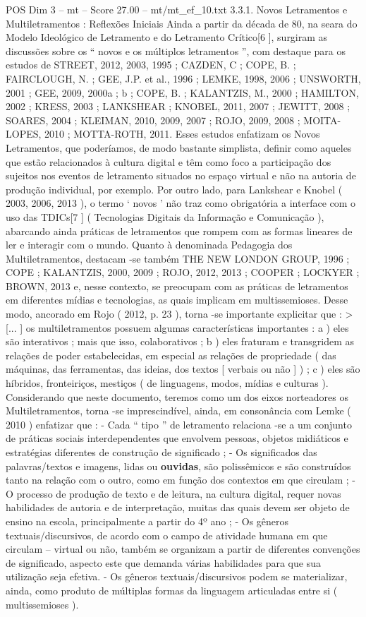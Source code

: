 \begin{textsample}{POS Dim 3 – mt – Score 27.00 – mt/mt\_ef\_10.txt}  \label{ex:f3_pos_077}
3.3.1.
Novos Letramentos e Multiletramentos : Reflexões Iniciais Ainda a partir da década de 80, na seara do Modelo Ideológico de Letramento e do Letramento Crítico[6 ], surgiram as discussões sobre os “ novos e os múltiplos letramentos ”, com destaque para os estudos de STREET, 2012, 2003, 1995 ; CAZDEN, C ; COPE, B. ; FAIRCLOUGH, N. ; GEE, J.P. et al., 1996 ; LEMKE, 1998, 2006 ; UNSWORTH, 2001 ; GEE, 2009, 2000a ; b ; COPE, B. ; KALANTZIS, M., 2000 ; HAMILTON, 2002 ; KRESS, 2003 ; LANKSHEAR ; KNOBEL, 2011, 2007 ; JEWITT, 2008 ; SOARES, 2004 ; KLEIMAN, 2010, 2009, 2007 ; ROJO, 2009, 2008 ; MOITA-LOPES, 2010 ; MOTTA-ROTH, 2011.
Esses estudos enfatizam os Novos Letramentos, que poderíamos, de modo bastante simplista, definir como aqueles que estão relacionados à cultura digital e têm como foco a participação dos sujeitos nos eventos de letramento situados no espaço virtual e não na autoria de produção individual, por exemplo.
Por outro lado, para Lankshear e Knobel ( 2003, 2006, 2013 ), o termo ‘ novos ’ não traz como obrigatória a interface com o uso das TDICs[7 ] ( Tecnologias Digitais da Informação e Comunicação ), abarcando ainda práticas de letramentos que rompem com as formas lineares de ler e interagir com o mundo.
Quanto à denominada Pedagogia dos Multiletramentos, destacam -se também THE NEW LONDON GROUP, 1996 ; COPE ; KALANTZIS, 2000, 2009 ; ROJO, 2012, 2013 ; COOPER ; LOCKYER ; BROWN, 2013 e, nesse contexto, se preocupam com as práticas de letramentos em diferentes mídias e tecnologias, as quais implicam em multissemioses.
Desse modo, ancorado em Rojo ( 2012, p. 23 ), torna -se importante explicitar que : > [... ] os multiletramentos possuem algumas características importantes : a ) eles são interativos ; mais que isso, colaborativos ; b ) eles fraturam e transgridem as relações de poder estabelecidas, em especial as relações de propriedade ( das máquinas, das ferramentas, das ideias, dos textos [ verbais ou não ] ) ; c ) eles são híbridos, fronteiriços, mestiços ( de linguagens, modos, mídias e culturas ).
Considerando que neste documento, teremos como um dos eixos norteadores os Multiletramentos, torna -se imprescindível, ainda, em consonância com Lemke ( 2010 ) enfatizar que : - Cada “ tipo ” de letramento relaciona -se a um conjunto de práticas sociais interdependentes que envolvem pessoas, objetos midiáticos e estratégias diferentes de construção de significado ; - Os significados das palavras/textos e imagens, lidas ou \textbf{ouvidas}, são polissêmicos e são construídos tanto na relação com o outro, como em função dos contextos em que circulam ; - O processo de produção de texto e de leitura, na cultura digital, requer novas habilidades de autoria e de interpretação, muitas das quais devem ser objeto de ensino na escola, principalmente a partir do 4º ano ; - Os gêneros textuais/discursivos, de acordo com o campo de atividade humana em que circulam – virtual ou não, também se organizam a partir de diferentes convenções de significado, aspecto este que demanda várias habilidades para que sua utilização seja efetiva. - Os gêneros textuais/discursivos podem se materializar, ainda, como produto de múltiplas formas da linguagem articuladas entre si ( multissemioses ).

\end{textsample}
